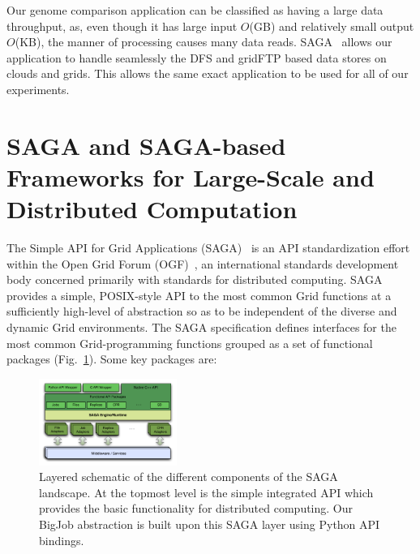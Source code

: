 \documentclass{rspublic}
\newcommand{\micnote}[1]{ {\textcolor{blue} { ***Michael: #1 }}}
\newcommand{\betynote}[1]{ {\textcolor{orange} { ***Bety: #1 }}}
\newcommand{\jhanote}[1]{} \newcommand{\micnote}[1]{}\newcommand{\betynote}[1]{} \newcommand{\fixme}[1]{}
\begin{document}

Our genome comparison application can be classified as having a large
data throughput, as, even though it has large input $O$(GB) and
relatively small output $O$(KB), the manner of processing causes many
data reads. SAGA~\citep{saga_web} allows our application to handle
seamlessly the DFS and gridFTP based data stores on clouds and grids.
This allows the same exact application to be used for all of our
experiments. 

\section{SAGA and SAGA-based Frameworks for Large-Scale and
  Distributed Computation}\label{Sec:SAGA}


The Simple API for Grid Applications (SAGA)~\cite{saga_url} is an API
standardization effort within the Open Grid Forum
(OGF)~\cite{saga_gfd90}, an international standards development body
concerned primarily with standards for distributed computing. SAGA
provides a simple, POSIX-style API to the most common Grid functions
at a sufficiently high-level of abstraction so as to be independent of
the diverse and dynamic Grid environments. The SAGA specification
defines interfaces for the most common Grid-programming functions
grouped as a set of functional packages (Fig.~\ref{Fig:SAGA1}). Some
key packages are:

\begin{figure}[!ht]
 \begin{center}
     \includegraphics[width=0.40\textwidth]{stci_saga_figures-1.pdf}
 \end{center}
\caption{\small Layered schematic of the different components of the
   SAGA landscape. At the topmost level is the simple integrated API
   which provides the basic functionality for distributed
   computing. Our BigJob abstraction is built upon this SAGA layer
   using Python API bindings.} \label{Fig:SAGA1}
\end{figure}
\end{document}
